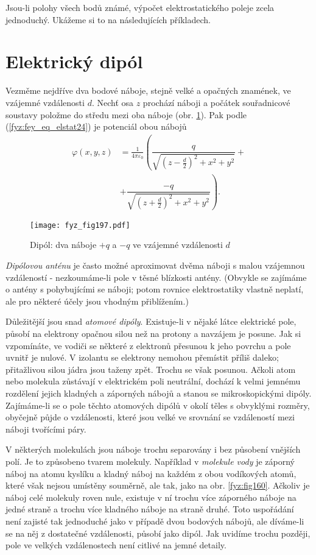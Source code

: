   Jsou-li polohy všech bodů známé, výpočet elektrostatického poleje zcela jednoduchý. Ukážeme si 
  to na následujících příkladech.

\section{Elektrický dipól}\label{fyz:IIchapVsecXI}
  Vezměme nejdříve dva bodové náboje, stejně velké a opačných znamének, ve vzájemné vzdálenosti 
  \(d\). Nechť osa \(z\) prochází náboji a počátek souřadnicové soustavy položme do středu mezi 
  oba náboje (obr. \ref{fyz:fig197}). Pak podle (\ref{fyz:fey_eq_elstat24}) je potenciál obou 
  nábojů
  \begin{align}
    \varphi(x,y,z) 
      &= \frac{1}{4\pi\varepsilon_0}
         \left(\dfrac{q}{\sqrt{(z -\frac{d}{2})^2+x^2+y^2}} + \right.    \nonumber \\         
      &+ \left.\dfrac{-q}{\sqrt{(z+\frac{d}{2})^2+x^2+y^2}}\right).      \label{fyz:eq_fey_009}
  \end{align}
  \begin{figure}[ht!] %
    \centering
    \texttt{[image: fyz\_fig197.pdf]}
    \caption{Dipól: dva náboje \(+q\) a \(-q\) ve vzájemné vzdálenosti \(d\)}
    \label{fyz:fig197}
  \end{figure}
  \emph{Dipólovou anténu} je často možné aproximovat dvěma náboji s malou vzájemnou vzdáleností 
  - nezkoumáme-li pole v těsné blízkosti antény. (Obvykle se zajímáme o antény s pohybujícími se 
  náboji; potom rovnice elektrostatiky vlastně neplatí, ale pro některé účely jsou vhodným 
  přiblížením.)
  
  Důležitější jsou snad \emph{atomové dipóly}. Existuje-li v nějaké látce elektrické pole, 
  působí na elektrony opačnou silou než na protony a navzájem je posune. Jak si vzpomínáte, ve 
  vodiči se některé z elektronů přesunou k jeho povrchu a pole uvnitř je nulové. V izolantu se 
  elektrony nemohou přemístit příliš daleko; přitažlivou silou jádra jsou taženy zpět. Trochu 
  se však posunou. Ačkoli atom nebo molekula zůstávají v elektrickém poli neutrální, dochází k 
  velmi jemnému rozdělení jejich kladných a záporných nábojů a stanou se mikroskopickými 
  dipóly. Zajímáme-li se o pole těchto atomových dipólů v okolí těles s obvyklými rozměry, 
  obyčejně půjde o vzdálenosti, které jsou velké ve srovnání se vzdáleností mezi náboji 
  tvořícími páry.
  
  V některých molekulách jsou náboje trochu separovány i bez působení vnějších polí. Je to 
  způsobeno tvarem molekuly. Například v \emph{molekule vody} je záporný náboj na atomu kyslíku 
  a kladný náboj na každém z obou vodíkových atomů, které však nejsou umístěny souměrně, ale 
  tak, jako na obr. \ref{fyz:fig160}. Ačkoliv je náboj celé molekuly roven nule, existuje v ní 
  trochu více záporného náboje na jedné straně a trochu více kladného náboje na straně druhé. 
  Toto uspořádání není zajisté tak jednoduché jako v případě dvou bodových nábojů, ale 
  díváme-li se na něj z dostatečné vzdálenosti, působí jako dipól. Jak uvidíme trochu později, 
  pole ve velkých vzdálenostech není citlivé na jemné detaily.

